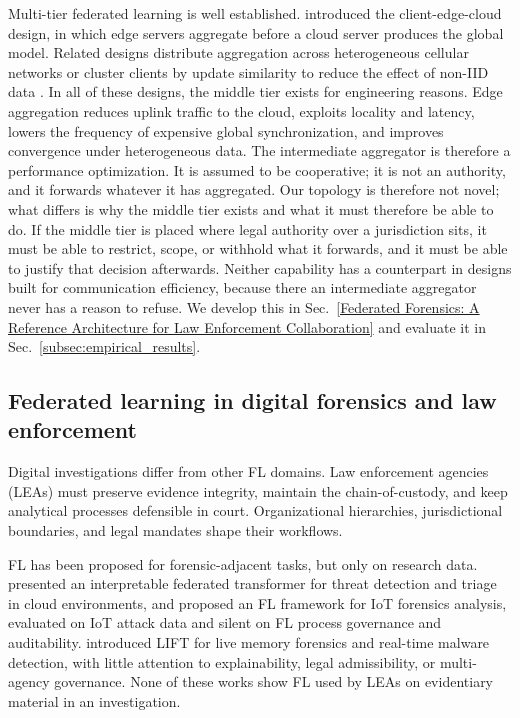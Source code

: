 Multi-tier federated learning is well established. \cite{9148862} introduced the client-edge-cloud design, in which edge servers aggregate before a cloud server produces the global model. Related designs distribute aggregation across heterogeneous cellular networks \citep{abad2020hierarchical} or cluster clients by update similarity to reduce the effect of non-IID data \citep{briggs2020hierarchical}.
%
In all of these designs, the middle tier exists for engineering reasons. Edge aggregation reduces uplink traffic to the cloud, exploits locality and latency, lowers the frequency of expensive global synchronization, and improves convergence under heterogeneous data. The intermediate aggregator is therefore a performance optimization. It is assumed to be cooperative; it is not an authority, and it forwards whatever it has aggregated.
%
Our topology is therefore not novel; what differs is why the middle tier exists and what it must therefore be able to do. If the middle tier is placed where legal authority over a jurisdiction sits, it must be able to restrict, scope, or withhold what it forwards, and it must be able to justify that decision afterwards. Neither capability has a counterpart in designs built for communication efficiency, because there an intermediate aggregator never has a reason to refuse. We develop this in Sec.~\ref{Federated Forensics: A Reference Architecture for Law Enforcement Collaboration} and evaluate it in Sec.~\ref{subsec:empirical_results}.



\subsection{Federated learning in digital forensics and law enforcement}

Digital investigations differ from other FL domains. Law enforcement agencies (LEAs) must preserve evidence integrity, maintain the chain-of-custody, and keep analytical processes defensible in court. Organizational hierarchies, jurisdictional boundaries, and legal mandates shape their workflows.

FL has been proposed for forensic-adjacent tasks, but only on research data.
\cite{Parra2022InterpretableFT} presented an interpretable federated transformer for threat detection and triage in cloud environments, and \cite{10.1145/3579375.3579387} proposed an FL framework for IoT forensics analysis, evaluated on IoT attack data and silent on FL process governance and auditability. \cite{dangi2025lift} introduced LIFT for live memory forensics and real-time malware detection, with little attention to explainability, legal admissibility, or multi-agency governance. None of these works show FL used by LEAs on evidentiary material in an investigation.

